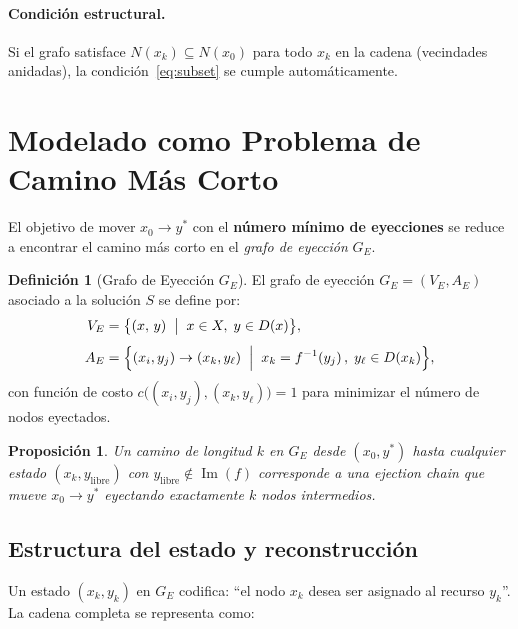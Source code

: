 \documentclass[12pt, a4paper]{article}
\theoremstyle{definition}
\newtheorem{definition}{Definición}[section]
\theoremstyle{plain}
\newtheorem{proposition}{Proposición}[section]
\theoremstyle{remark}
\newcommand{\GE}{G_{\!E}}
\newcommand{\dom}[1]{D\!\left(#1\right)}
\newcommand{\inv}[1]{f^{-1}\!\left(#1\right)}
\newcommand{\Nset}[1]{N\!\left(#1\right)}
\begin{document}
\paragraph{Condición estructural.} Si el grafo satisface
$\Nset{x_k} \subseteq \Nset{x_0}$ para todo $x_k$ en la cadena
(vecindades anidadas), la condición~\eqref{eq:subset} se cumple
automáticamente.

\section{Modelado como Problema de Camino Más Corto}

El objetivo de mover $x_0 \to y^*$ con el \textbf{número mínimo de eyecciones}
se reduce a encontrar el camino más corto en el \emph{grafo de eyección}
$\GE$.

\begin{definition}[Grafo de Eyección \texorpdfstring{$\GE$}{GE}]
  \label{def:ge}
  El grafo de eyección $\GE = (V_E, A_E)$ asociado a la solución $S$ se
  define por:
  \begin{align}
    V_E &= \bigl\{(x,\, y) \;\bigm|\; x \in X,\; y \in \dom{x}\bigr\},
    \label{eq:VE}\\[4pt]
    A_E &= \Bigl\{(x_i, y_j) \to (x_k, y_\ell) \;\Bigm|\;
            x_k = \inv{y_j},\;
            y_\ell \in \dom{x_k}\Bigr\},
    \label{eq:AE}
  \end{align}
  con función de costo $c\bigl((x_i,y_j),(x_k,y_\ell)\bigr) = 1$ para
  minimizar el número de nodos eyectados.
\end{definition}

\begin{proposition}
  Un camino de longitud $k$ en $\GE$ desde $(x_0, y^*)$ hasta cualquier
  estado $(x_k, y_{\text{libre}})$ con $y_{\text{libre}} \notin \operatorname{Im}(f)$
  corresponde a una ejection chain que mueve $x_0 \to y^*$ eyectando
  exactamente $k$ nodos intermedios.
\end{proposition}

\subsection{Estructura del estado y reconstrucción}

Un estado $(x_k, y_k)$ en $\GE$ codifica: ``el nodo $x_k$ desea ser asignado
al recurso $y_k$''.  La cadena completa se representa como:
\end{document}
